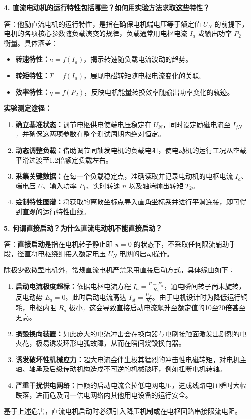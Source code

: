 \begin{framed}
{			\vspace{1em}
			
			\textbf{4. 直流电动机的运行特性包括哪些？如何用实验方法求取这些特性？}
			
			答：他励直流电机的运行特性，是指在确保电机端电压等于额定值 $U_N$ 的前提下，电机的各项核心参数随负载演变的规律，负载通常用电枢电流 $I_a$ 或输出功率 $P_2$ 衡量。具体涵盖：
			\begin{itemize}
				\item \textbf{转速特性：}$n = f(I_a)$，揭示转速随负载电流波动的趋势。
				\item \textbf{转矩特性：}$T = f(I_a)$，展现电磁转矩随电枢电流变化的关联。
				\item \textbf{效率特性：}$\eta = f(P_2)$，反映电机能量转换效率随输出功率变化的轨迹。
			\end{itemize}
			\textbf{实验测定途径：}
			\begin{enumerate}
				\item \textbf{确立基准状态：}调节电枢供电使端电压稳定在 $U_N$，同时设定励磁电流至 $I_{fN}$，并确保这两项参数在整个测试周期内绝对恒定。
				\item \textbf{动态调整负载：}借助调节同轴发电机的负载电阻，使电动机的运行工况从空载平滑过渡至1.2倍额定负载左右。
				\item \textbf{采集关键数据：}在每一个负载稳定点，准确读取并记录电动机的电枢电流 $I_a$、端电压 $U$、输入功率 $P_1$、实时转速 $n$ 以及轴端输出转矩 $T_2$。
				\item \textbf{绘制特性图谱：}将获取的离散坐标点导入直角坐标系并进行平滑连接，即可得到直观的运行特性曲线。
			\end{enumerate}
			
			\vspace{1em}
			
			\textbf{5. 何谓直接启动？为什么直流电动机不能直接启动？}
			
			答：\textbf{直接启动}是指在电机转子静止即 $n=0$ 的状态下，不采取任何限流辅助手段，径直将电枢绕组接入额定电压 $U_N$ 电网的启动操作。
			
			除极少数微型电机外，常规直流电机严禁采用直接启动方式，具体缘由如下：
			\begin{enumerate}
				\item \textbf{启动电流极度超标：}依据电枢电流方程 $I_a = \frac{U - E_a}{R_a}$，通电瞬间转子尚未旋转，反电动势 $E_a = 0$。此时启动电流高达 $I_{st} = \frac{U_N}{R_a}$。由于电机设计时为降低运行铜耗，电枢内阻 $R_a$ 极小，这会导致直接启动电流飙升至额定值的10至20倍甚至更高。
				\item \textbf{损毁换向装置：}如此庞大的电流冲击会在换向器与电刷接触面激发出剧烈的电火花，极易诱发环形电弧故障，从而在瞬间烧毁换向器。
				\item \textbf{诱发破坏性机械应力：}超大电流会伴生极其猛烈的冲击性电磁转矩，对电机主轴、轴承及后级传动机构造成不可逆的机械破坏，例如扭断电机转轴。
				\item \textbf{严重干扰供电网络：}巨额的启动电流会拉低电网电压，造成线路电压瞬时大幅跌落，进而危及同一供电网络内其他用电设备的运行安全。
			\end{enumerate}
			
			基于上述危害，直流电机启动时必须引入降压机制或在电枢回路串接限流电阻。
			
		}
	\end{framed}
